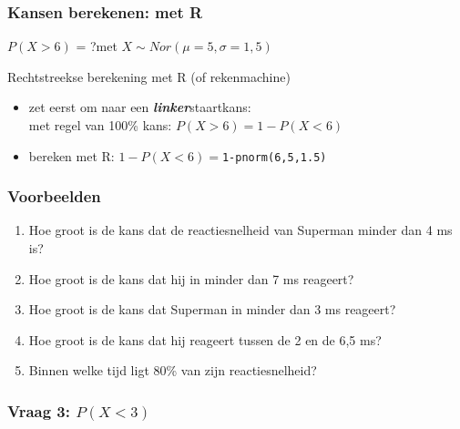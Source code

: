 \documentclass[aspectratio=169]{beamer}
\begin{document}
\begin{frame}
  \frametitle{Kansen berekenen: met R}
  
  $P( X > 6)$ = ?\hspace{1cm}met $X \sim Nor(\mu=5,\sigma=1,5)$
  
  Rechtstreekse berekening met R (of rekenmachine)
  
  \begin{itemize}
    \pause
    \item zet eerst om naar een \textbf{\textit{linker}}staartkans:\\
    met regel van 100\% kans: $P(X>6)=1-P(X<6)$
    \item bereken met R: $1-P(X<6)=$\texttt{1-pnorm(6,5,1.5)}
  \end{itemize}
\end{frame}

\begin{frame}
  \frametitle{Voorbeelden}
  
  \begin{enumerate}
    \item Hoe groot is de kans dat de reactiesnelheid van Superman minder dan 4 ms is?
    \item Hoe groot is de kans dat hij in minder dan 7 ms reageert?
    \item Hoe groot is de kans dat Superman in minder dan 3 ms reageert?
    \item Hoe groot is de kans dat hij reageert tussen de 2 en de 6,5 ms?
    \item Binnen welke tijd ligt 80\% van zijn reactiesnelheid?
  \end{enumerate}
\end{frame}

\begin{frame}
  \frametitle{Vraag 3: $P(X<3)$}
  
  \begin{center}
  \end{center}
\end{frame}
\end{document}
